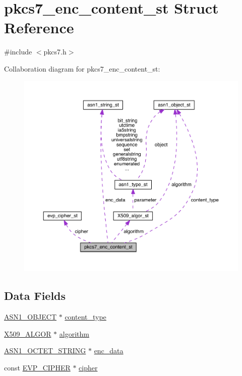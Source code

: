 \hypertarget{structpkcs7__enc__content__st}{}\section{pkcs7\+\_\+enc\+\_\+content\+\_\+st Struct Reference}
\label{structpkcs7__enc__content__st}


{\ttfamily \#include $<$pkcs7.\+h$>$}



Collaboration diagram for pkcs7\+\_\+enc\+\_\+content\+\_\+st\+:\nopagebreak
\begin{figure}[H]
\begin{center}
\leavevmode
\includegraphics[width=350pt]{structpkcs7__enc__content__st__coll__graph}
\end{center}
\end{figure}
\subsection*{Data Fields}
\begin{DoxyCompactItemize}
\item 
\hyperlink{crypto_2ossl__typ_8h_ae3fda0801e4c8e250087052bafb3ce2e}{A\+S\+N1\+\_\+\+O\+B\+J\+E\+CT} $\ast$ \hyperlink{structpkcs7__enc__content__st_a5967ebb0378512568b4332e9ddb213af}{content\+\_\+type}
\item 
\hyperlink{crypto_2ossl__typ_8h_aa2b6185e6254f36f709cd6577fb5022e}{X509\+\_\+\+A\+L\+G\+OR} $\ast$ \hyperlink{structpkcs7__enc__content__st_a6464dff2253362ccee1bfaf6c7abf0ca}{algorithm}
\item 
\hyperlink{crypto_2ossl__typ_8h_afbd05e94e0f0430a2b729473efec88c1}{A\+S\+N1\+\_\+\+O\+C\+T\+E\+T\+\_\+\+S\+T\+R\+I\+NG} $\ast$ \hyperlink{structpkcs7__enc__content__st_a6431c24812ff29cc02897d8485767633}{enc\+\_\+data}
\item 
const \hyperlink{crypto_2ossl__typ_8h_a54a8663a8084d45c31f2786156b55405}{E\+V\+P\+\_\+\+C\+I\+P\+H\+ER} $\ast$ \hyperlink{structpkcs7__enc__content__st_a535356548694b85372c7d1fb18e05f1d}{cipher}
\end{DoxyCompactItemize}


